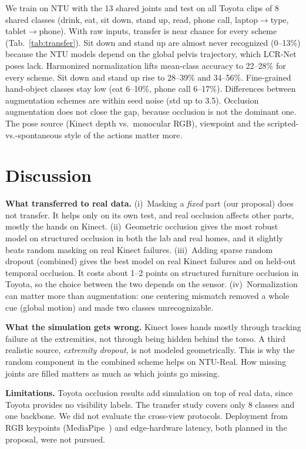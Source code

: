 \documentclass[11pt,twocolumn,letterpaper]{article}
\begin{document}
We train on NTU with the 13 shared joints and test on all Toyota clips of 8 shared classes (drink, eat, sit down, stand up, read, phone call, laptop$\rightarrow$type, tablet$\rightarrow$phone).
With raw inputs, transfer is near chance for every scheme (Tab.~\ref{tab:transfer}).
Sit down and stand up are almost never recognized (0--13\%) because the NTU models depend on the global pelvis trajectory, which LCR-Net poses lack.
Harmonized normalization lifts mean-class accuracy to 22--28\% for every scheme.
Sit down and stand up rise to 28--39\% and 34--56\%.
Fine-grained hand-object classes stay low (eat 6--10\%, phone call 6--17\%).
Differences between augmentation schemes are within seed noise (std up to 3.5).
Occlusion augmentation does not close the gap, because occlusion is not the dominant one.
The pose source (Kinect depth vs.\ monocular RGB), viewpoint and the scripted-vs.-spontaneous style of the actions matter more.

\section{Discussion}\label{sec:disc}
\textbf{What transferred to real data.}
(i)~Masking a \emph{fixed} part (our proposal) does not transfer. It helps only on its own test, and real occlusion affects other parts, mostly the hands on Kinect.
(ii)~Geometric occlusion gives the most robust model on structured occlusion in both the lab and real homes, and it slightly beats random masking on real Kinect failures.
(iii)~Adding sparse random dropout (combined) gives the best model on real Kinect failures and on held-out temporal occlusion.
It costs about 1--2 points on structured furniture occlusion in Toyota, so the choice between the two depends on the sensor.
(iv)~Normalization can matter more than augmentation: one centering mismatch removed a whole cue (global motion) and made two classes unrecognizable.

\textbf{What the simulation gets wrong.}
Kinect loses hands mostly through tracking failure at the extremities, not through being hidden behind the torso.
A third realistic source, \emph{extremity dropout}, is not modeled geometrically.
This is why the random component in the combined scheme helps on NTU-Real.
How missing joints are filled matters as much as which joints go missing.

\textbf{Limitations.}
Toyota occlusion results add simulation on top of real data, since Toyota provides no visibility labels.
The transfer study covers only 8 classes and one backbone.
We did not evaluate the cross-view protocols.
Deployment from RGB keypoints (MediaPipe~\cite{lugaresi2019mediapipe}) and edge-hardware latency, both planned in the proposal, were not pursued.
\end{document}
